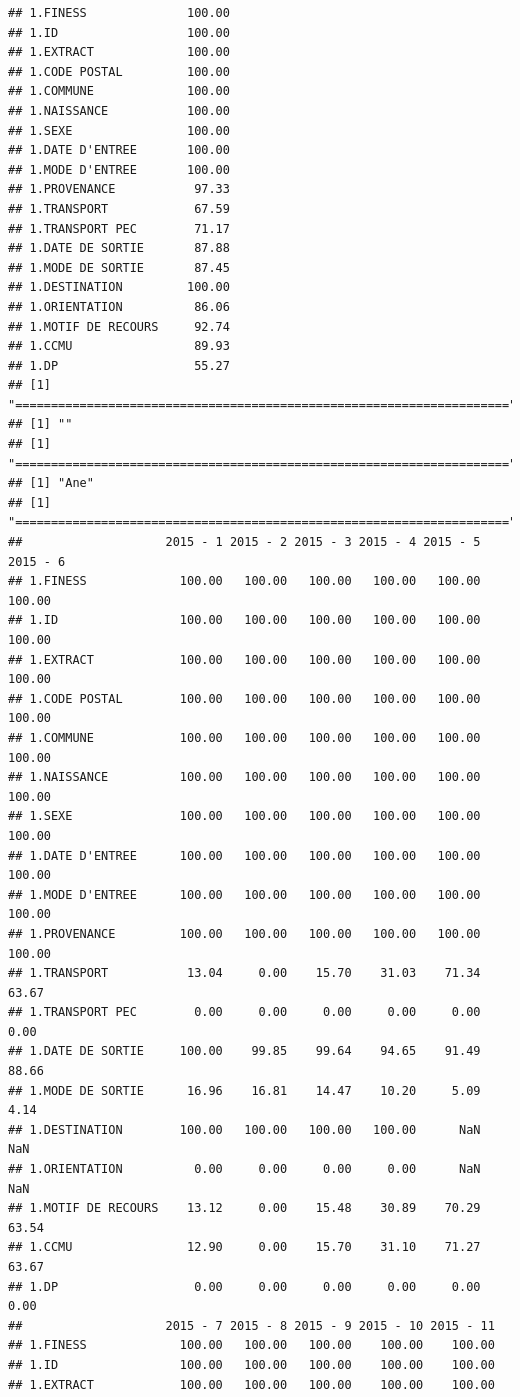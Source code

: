 \documentclass[]{article}
\begin{document}
\begin{verbatim}
## 1.FINESS              100.00
## 1.ID                  100.00
## 1.EXTRACT             100.00
## 1.CODE POSTAL         100.00
## 1.COMMUNE             100.00
## 1.NAISSANCE           100.00
## 1.SEXE                100.00
## 1.DATE D'ENTREE       100.00
## 1.MODE D'ENTREE       100.00
## 1.PROVENANCE           97.33
## 1.TRANSPORT            67.59
## 1.TRANSPORT PEC        71.17
## 1.DATE DE SORTIE       87.88
## 1.MODE DE SORTIE       87.45
## 1.DESTINATION         100.00
## 1.ORIENTATION          86.06
## 1.MOTIF DE RECOURS     92.74
## 1.CCMU                 89.93
## 1.DP                   55.27
## [1] "====================================================================="
## [1] ""
## [1] "====================================================================="
## [1] "Ane"
## [1] "====================================================================="
##                    2015 - 1 2015 - 2 2015 - 3 2015 - 4 2015 - 5 2015 - 6
## 1.FINESS             100.00   100.00   100.00   100.00   100.00   100.00
## 1.ID                 100.00   100.00   100.00   100.00   100.00   100.00
## 1.EXTRACT            100.00   100.00   100.00   100.00   100.00   100.00
## 1.CODE POSTAL        100.00   100.00   100.00   100.00   100.00   100.00
## 1.COMMUNE            100.00   100.00   100.00   100.00   100.00   100.00
## 1.NAISSANCE          100.00   100.00   100.00   100.00   100.00   100.00
## 1.SEXE               100.00   100.00   100.00   100.00   100.00   100.00
## 1.DATE D'ENTREE      100.00   100.00   100.00   100.00   100.00   100.00
## 1.MODE D'ENTREE      100.00   100.00   100.00   100.00   100.00   100.00
## 1.PROVENANCE         100.00   100.00   100.00   100.00   100.00   100.00
## 1.TRANSPORT           13.04     0.00    15.70    31.03    71.34    63.67
## 1.TRANSPORT PEC        0.00     0.00     0.00     0.00     0.00     0.00
## 1.DATE DE SORTIE     100.00    99.85    99.64    94.65    91.49    88.66
## 1.MODE DE SORTIE      16.96    16.81    14.47    10.20     5.09     4.14
## 1.DESTINATION        100.00   100.00   100.00   100.00      NaN      NaN
## 1.ORIENTATION          0.00     0.00     0.00     0.00      NaN      NaN
## 1.MOTIF DE RECOURS    13.12     0.00    15.48    30.89    70.29    63.54
## 1.CCMU                12.90     0.00    15.70    31.10    71.27    63.67
## 1.DP                   0.00     0.00     0.00     0.00     0.00     0.00
##                    2015 - 7 2015 - 8 2015 - 9 2015 - 10 2015 - 11
## 1.FINESS             100.00   100.00   100.00    100.00    100.00
## 1.ID                 100.00   100.00   100.00    100.00    100.00
## 1.EXTRACT            100.00   100.00   100.00    100.00    100.00

\end{verbatim}
\end{document}

